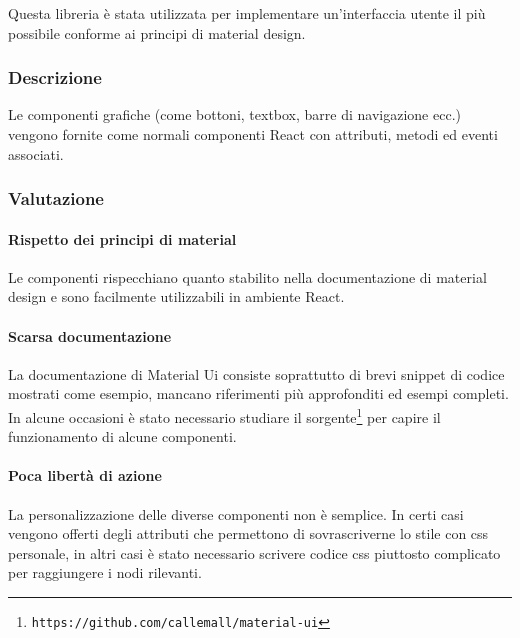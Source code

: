 Questa libreria è stata utilizzata per implementare un'interfaccia utente il più
possibile conforme ai principi di material design.

\subsubsection{Descrizione}
Le componenti grafiche (come bottoni, textbox, barre di navigazione ecc.) vengono
fornite come normali componenti React con attributi, metodi ed eventi associati.

\subsubsection{Valutazione}

\paragraph{Rispetto dei principi di material} Le componenti rispecchiano quanto
stabilito nella documentazione di material design e sono facilmente utilizzabili
in ambiente React.

\paragraph{Scarsa documentazione} La documentazione di Material Ui consiste soprattutto
di brevi snippet di codice mostrati come esempio, mancano riferimenti più approfonditi ed
esempi completi. In alcune occasioni è stato necessario studiare il sorgente\footnote{\texttt{https://github.com/callemall/material-ui}} per capire il
funzionamento di alcune componenti.

\paragraph{Poca libertà di azione} La personalizzazione delle diverse componenti non è
semplice. In certi casi vengono offerti degli attributi che permettono di sovrascriverne
lo stile con css personale, in altri casi è stato necessario scrivere codice css piuttosto
complicato per raggiungere i nodi rilevanti.


